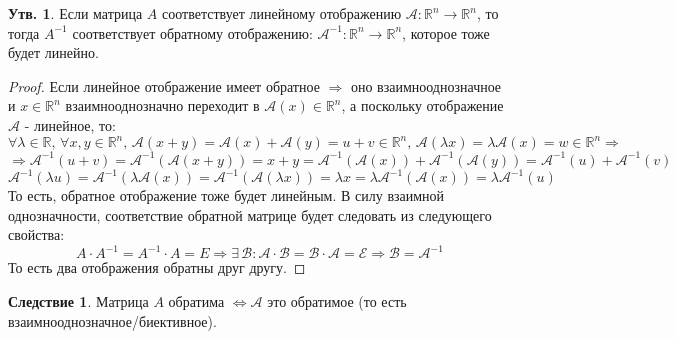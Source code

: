\documentclass[12pt]{article}
\newcommand{\MR}{\mathbb{R}}
\newcommand{\MA}{\mathcal{A}}
\newcommand{\MCB}{\mathcal{B}}
\newcommand{\MCE}{\mathcal{E}}
\theoremstyle{definition}
\newtheorem{prop}{Утв.}
\newtheorem{corollary}{Следствие}
\begin{document}
\begin{prop}
	Если матрица $A$ соответствует линейному отображению $\MA \colon \MR^n \to \MR^n$, то тогда $A^{-1}$ соответствует обратному отображению: $\MA^{-1} \colon \MR^n \to \MR^n$, которое тоже будет линейно.
\end{prop}
\begin{proof}
	Если линейное отображение имеет обратное $\Rightarrow$ оно взаимнооднозначное и $x \in \MR^n$ взаимнооднозначно переходит в $\MA(x) \in \MR^n$, а поскольку отображение $\MA$ - линейное, то:
	$$
		\forall \lambda \in \MR, \, \forall x,y \in \MR^n, \, \MA(x + y) = \MA(x) + \MA(y) = u + v \in \MR^n, \, \MA(\lambda x) = \lambda\MA(x) = w \in \MR^n \Rightarrow
	$$
	$$
		\Rightarrow \MA^{-1}(u + v)  = \MA^{-1}(\MA(x + y)) = x + y = \MA^{-1}(\MA(x)) + \MA^{-1}(\MA(y)) = \MA^{-1}(u) + \MA^{-1}(v)
	$$
	$$
		\MA^{-1}(\lambda u)=\MA^{-1}(\lambda\MA( x)) = \MA^{-1}(\MA( \lambda x)) = \lambda x = \lambda \MA^{-1}(\MA(x)) = \lambda \MA^{-1}(u)
	$$
	То есть, обратное отображение тоже будет линейным. В силу взаимной однозначности, соответствие обратной матрице будет следовать из следующего свойства:
	$$
		A{\cdot}A^{-1} = A^{-1}{\cdot}A = E \Rightarrow \exists \, \MCB \colon \MA{\cdot}\MCB = \MCB{\cdot}\MA = \MCE \Rightarrow \MCB = \MA^{-1}
	$$
	То есть два отображения обратны друг другу.
\end{proof}
\begin{corollary}
	Матрица $A$ обратима $\Leftrightarrow \MA$ это обратимое (то есть взаимнооднозначное/биективное).
\end{corollary}
\end{document}
